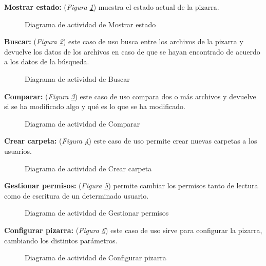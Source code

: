 \textbf{Mostrar estado:} (\emph{Figura \ref{fig:mostrarEstado}}) muestra el estado actual de la pizarra.

\begin{figure}[H]
\centering
\mostrarEstado
\caption{Diagrama de actividad de Mostrar estado}
\label{fig:mostrarEstado}
\end{figure}
\newpage

\textbf{Buscar:} (\emph{Figura \ref{fig:buscar}}) este caso de uso busca entre los archivos de la pizarra y devuelve los datos de los archivos en caso de que se hayan encontrado de acuerdo a los datos de la búsqueda.

\begin{figure}[H]
\centering
\buscar
\caption{Diagrama de actividad de Buscar}
\label{fig:buscar}
\end{figure}
\newpage

\textbf{Comparar:} (\emph{Figura \ref{fig:comparar}}) este caso de uso compara dos o más archivos y devuelve si se ha modificado algo y qué es lo que se ha modificado.

\begin{figure}[H]
\centering
\comparar
\caption{Diagrama de actividad de Comparar}
\label{fig:comparar}
\end{figure}
\newpage

\textbf{Crear carpeta:} (\emph{Figura \ref{fig:crearCarpeta}}) este caso de uso permite crear nuevas carpetas a los usuarios.

\begin{figure}[H]
\centering
\crearCarpeta
\caption{Diagrama de actividad de Crear carpeta}
\label{fig:crearCarpeta}
\end{figure}
\newpage

\textbf{Gestionar permisos:} (\emph{Figura \ref{fig:gestionarPermisos}}) permite cambiar los permisos tanto de lectura como de escritura de un determinado usuario.

\begin{figure}[H]
\centering
\gestionarPermisos
\caption{Diagrama de actividad de Gestionar permisos}
\label{fig:gestionarPermisos}
\end{figure}
\newpage

\textbf{Configurar pizarra:} (\emph{Figura \ref{fig:configurarPizarra}}) este caso de uso sirve para configurar la pizarra, cambiando los distintos parámetros.

\begin{figure}[H]
\centering
\configurarPizarra
\caption{Diagrama de actividad de Configurar pizarra}
\label{fig:configurarPizarra}
\end{figure}
\newpage

